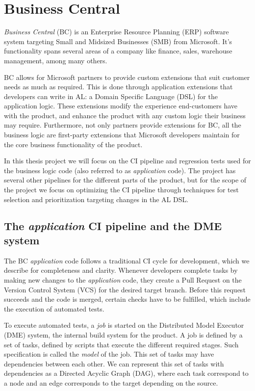 \section{Business Central}

\emph{Business Central} (BC) is an Enterprise Resource Planning (ERP) software 
system targeting Small and Midsized Businesses (SMB) from Microsoft. It's functionality
spans several areas of a company like finance, sales, warehouse management, among
many others.

BC allows for Microsoft partners to provide custom extensions that suit customer
needs as much as required. This is done through application extensions that developers
can write in AL: a Domain Specific Language (DSL) for the application logic. 
These extensions modify the experience end-customers have with the product, and 
enhance the product with any custom logic their business may require.
Furthermore, not only partners provide extensions for BC, all the business logic
are first-party extensions that Microsoft developers maintain for the core business 
functionality of the product.

In this thesis project we will focus on the CI pipeline and regression tests
used for the business logic code (also referred to as \emph{application} code).
The project has several other pipelines for the different parts of the product,
but for the scope of the project we focus on optimizing the CI pipeline through
techniques for test selection and prioritization targeting changes in the AL DSL.

\subsection{The \emph{application} CI pipeline and the DME system}\label{s:bc-ci-dme}

The BC \emph{application} code follows a traditional CI cycle for development, which we describe 
for completeness and clarity. Whenever developers complete tasks by making new 
changes to the \emph{application} code, they create a Pull Request on the 
Version Control System (VCS) for the desired target branch. Before this request
succeeds and the code is merged, certain checks have to be fulfilled, which 
include the execution of automated tests.

To execute automated tests, a \emph{job} is started on the Distributed Model Executor (DME)
system, the internal build system for the product.  A job is defined by a set of 
tasks, defined by scripts that execute the different required stages. Such specification is
called the \emph{model} of the job. This set of tasks may have dependencies between each other. 
We can represent this set of tasks with dependencies as a Directed Acyclic Graph (DAG), where
each task correspond to a node and an edge corresponds to the target depending on the source.

